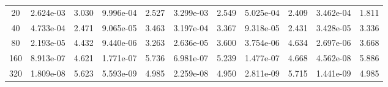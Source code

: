 \documentclass[english]{article}
\theoremstyle{thmstyleone}
\theoremstyle{thmstyletwo}
\theoremstyle{thmstylethree}
\begin{document}
\begin{table}[ht]
\begin{adjustbox}{width=1\textwidth}
\begin{subtable}{1.\linewidth}
\begin{tabular}{ccccccccccc}
				20 & 2.624e-03 & 3.030 & 9.996e-04 & 2.527 & 3.299e-03 & 2.549 & 5.025e-04 & 2.409 & 3.462e-04 & 1.811 \\
				40 & 4.733e-04 & 2.471 & 9.065e-05 & 3.463 & 3.197e-04 & 3.367 & 9.318e-05 & 2.431 & 3.428e-05 & 3.336 \\
				80 & 2.193e-05 & 4.432 & 9.440e-06 & 3.263 & 2.636e-05 & 3.600 & 3.754e-06 & 4.634 & 2.697e-06 & 3.668 \\
				160 & 8.913e-07 & 4.621 & 1.771e-07 & 5.736 & 6.981e-07 & 5.239 & 1.477e-07 & 4.668 & 4.562e-08 & 5.886 \\
				320 & 1.809e-08 & 5.623 & 5.593e-09 & 4.985 & 2.259e-08 & 4.950 & 2.811e-09 & 5.715 & 1.441e-09 & 4.985 \\
				\bottomrule
			\end{tabular}
		\end{subtable}
	\end{adjustbox}
\end{table}
\end{document}
